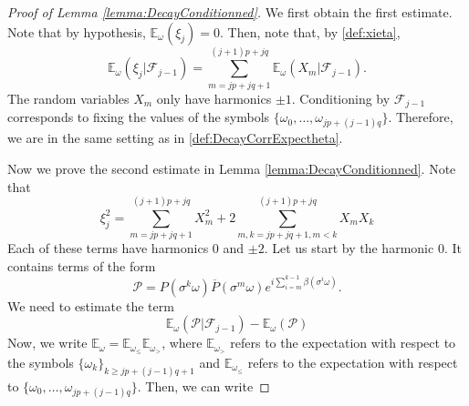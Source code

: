 \documentclass[10pt,a4paper]{amsart}
\newcommand{\E}{\mathbb{E}}
\newcommand{\FF}{\mathcal{F}}
\newcommand{\PP}{\mathcal{P}}
\newcommand{\ol}{\overline}
\begin{document}
\begin{proof}[Proof of Lemma \ref{lemma:DecayConditionned}]
We first obtain the first estimate. Note that by hypothesis, $\E_\omega(\xi_j)=0$.
Then, note that, by \eqref{def:xieta},
\[
\E_\omega(\xi_j|\FF_{j-1})=\sum_{m=jp+jq+1}^{(j+1)p+jq}\E_\omega(X_m|\FF_{j-1}).
 \]
The random variables $X_m$ only have harmonics $\pm 1$. Conditioning by $\FF_{j-1}$ corresponds to fixing the values of the symbols $\{\omega_0,\ldots, \omega_{jp+(j-1)q}\}$. Therefore, we are in the same setting as in \eqref{def:DecayCorrExpectheta}.

Now we prove the second estimate in Lemma \ref{lemma:DecayConditionned}. Note that 
\begin{equation}\label{def:xideg2}
\xi_j^2=\sum_{m=jp+jq+1}^{(j+1)p+jq}X_m^2+2\sum_{m,k=jp+jq+1, m<k}^{(j+1)p+jq}X_mX_k
\end{equation}
Each of these terms have harmonics $0$ and $\pm 2$. Let us start by the harmonic $0$. It contains terms of the form 
\[
\PP= P(\sigma^k\omega)\ol P(\sigma^m\omega)e^{i\sum_{i=m}^{k-1}\beta(\sigma^i\omega)}.
\]
We need to estimate the term
\[
\E_\omega\left(\left. \PP\right|\FF_{j-1}\right)-\E_\omega\left( \PP\right)
\]
Now, we write $\E_\omega=\E_{\omega_\leq}\E_{\omega_>}$, where $\E_{\omega_>}$ refers to the expectation with respect to the symbols $\{\omega_k\}_{k\geq jp+(j-1)q+1}$ and $\E_{\omega_\leq}$ refers to the expectation with respect to $\{\omega_0,\ldots, \omega_{jp+(j-1)q}\}$. Then, we can write 

\end{proof}
\end{document}
